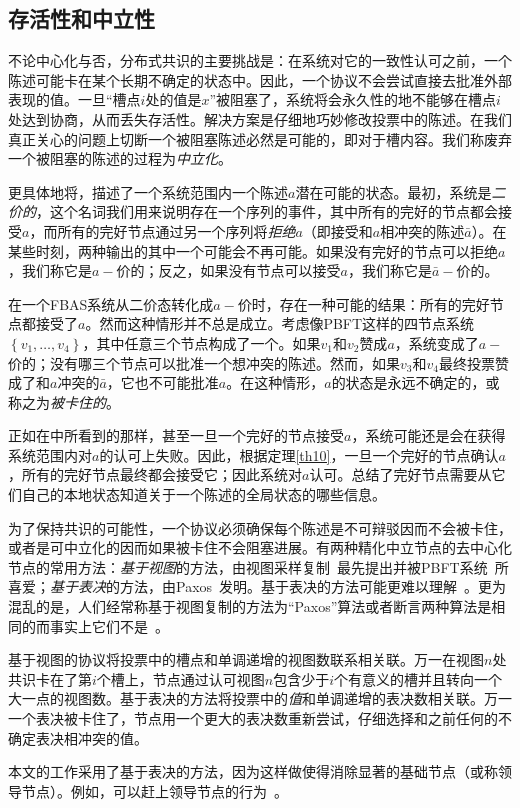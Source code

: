 \subsection{存活性和中立性}\label{sec:vote_stuck}

不论中心化与否，分布式共识的主要挑战是：在系统对它的一致性认可之前，一个陈述可能卡在某个长期不确定的状态中。因此，一个协议不会尝试直接去批准外部表现的值。一旦``槽点$i$处的值是$x$''被阻塞了，系统将会永久性的地不能够在槽点$i$处达到协商，从而丢失存活性。解决方案是仔细地巧妙修改投票中的陈述。在我们真正关心的问题上切断一个被阻塞陈述必然是可能的，即对于槽内容。我们称废弃一个被阻塞的陈述的过程为\textit{中立化}。

更具体地将，描述了一个系统范围内一个陈述$a$潜在可能的状态。最初，系统是\textit{二价的}，这个名词我们用来说明存在一个序列的事件，其中所有的完好的节点都会接受$a$，而所有的完好节点通过另一个序列将\textit{拒绝}$a$（即接受和$a$相冲突的陈述$\bar a$）。在某些时刻，两种输出的其中一个可能会不再可能。如果没有完好的节点可以拒绝$a$，我们称它是$a-$价的；反之，如果没有节点可以接受$a$，我们称它是$\bar a-$价的。

在一个FBAS系统从二价态转化成$a-\!\!$价时，存在一种可能的结果：所有的完好节点都接受了$a$。然而这种情形并不总是成立。考虑像PBFT这样的四节点系统$\left\{v_1,\ldots,v_4\right\}$，其中任意三个节点构成了一个{\quorum}。如果$v_1$和$v_2$赞成$a$，系统变成了$a-\!\!$价的；没有哪三个节点可以批准一个想冲突的陈述。然而，如果$v_3$和$v_4$最终投票赞成了和$a$冲突的$\bar a$，它也不可能批准$a$。在这种情形，$a$的状态是永远不确定的，或称之为\textit{被卡住的}。

正如在中所看到的那样，甚至一旦一个完好的节点接受$a$，系统可能还是会在获得系统范围内对$a$的认可上失败。因此，根据定理\ref{th10}，一旦一个完好的节点确认$a$，所有的完好节点最终都会接受它；因此系统对$a$认可。总结了完好节点需要从它们自己的本地状态知道关于一个陈述的全局状态的哪些信息。

为了保持共识的可能性，一个协议必须确保每个陈述是不可辩驳因而不会被卡住，或者是可中立化的因而如果被卡住不会阻塞进展。有两种精化中立节点的去中心化节点的常用方法：\textit{基于视图}的方法，由视图采样复制~\cite{Oki:1988:VRN:62546.62549}最先提出并被PBFT系统~\cite{Castro:1999:PBFT}所喜爱；\textit{基于表决}的方法，由Paxos~\cite{Lamport:1998:PP:279227.279229}发明。基于表决的方法可能更难以理解~\cite{Ongaro:2014:SUC:2643634.2643666}。更为混乱的是，人们经常称基于视图复制的方法为``Paxos''算法或者断言两种算法是相同的而事实上它们不是~\cite{6894199}。

基于视图的协议将投票中的槽点和单调递增的视图数联系相关联。万一在视图$n$处共识卡在了第$i$个槽上，节点通过认可视图$n$包含少于$i$个有意义的槽并且转向一个大一点的视图数。基于表决的方法将投票中的\textit{值}和单调递增的表决数相关联。万一一个表决被卡住了，节点用一个更大的表决数重新尝试，仔细选择和之前任何的不确定表决相冲突的值。

本文的工作采用了基于表决的方法，因为这样做使得消除显著的基础节点（或称领导节点）。例如，可以赶上领导节点的行为~\cite{Lamport:2011:BPR:2075029.2075058}。
